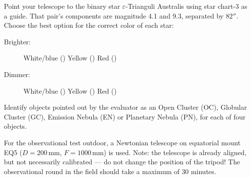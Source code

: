 Point your telescope to the binary star $\varepsilon$-Trianguli Australis
using star chart-3 as a guide. That pair's components are magnitude 4.1 and
9.3, separated by $82''$. Choose the best option for the correct color of
each star:

\begin{description}
\item[Brighter:] White/blue (\quad) \qquad Yellow (\quad) \qquad
  Red (\quad)
\item[Dimmer:] White/blue (\quad) \qquad Yellow (\quad) \qquad
  Red (\quad)
\end{description}

Identify objects pointed out by the evaluator as an Open Cluster (OC), Globular
Cluster (GC), Emission Nebula (EN) or Planetary Nebula (PN), for each of four
objects.

For the observational test outdoor, a Newtonian telescope on equatorial
mount EQ5 ($D = 200$\,mm, $F = 1000$\,mm) is used. Note: the telescope is
already aligned, but not necessarily calibrated --- do not change the
position of the tripod! The observational round in the field should take a
maximum of 30 minutes.

